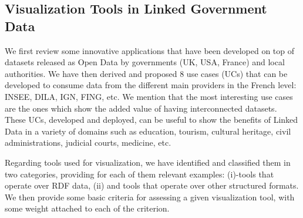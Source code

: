 \documentclass[a4paper,11pt,twoside]{report}
\begin{document}
\subsection{Visualization Tools in Linked Government Data} \label{visu}

We first review some innovative applications that have been developed on top of datasets released as Open Data by governments (UK, USA, France) and local authorities. We have then derived and proposed 8 use cases (UCs) that can be developed to consume data from the different main providers in the French level: INSEE, DILA, IGN, FING, etc. We mention that the most interesting use cases are the ones which show the added value of having interconnected datasets. These UCs,  developed and deployed, can be useful to show the benefits of Linked Data in a variety of domains such as education, tourism, cultural heritage, civil administrations, judicial courts, medicine, etc. 

Regarding tools used for visualization, we have identified and classified them in two categories, providing for each of them relevant examples: (i)-tools that operate over RDF data, (ii) and tools that operate over other structured formats. We then provide some basic criteria for assessing a given visualization tool, with some weight attached to each of the criterion. 
\end{document}
